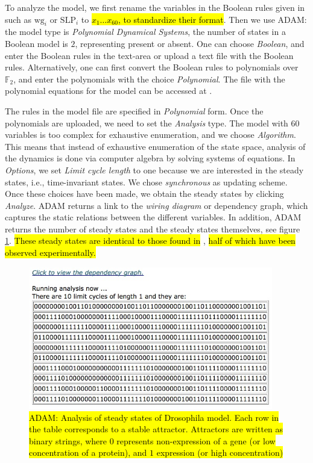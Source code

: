 \documentclass[10pt]{bmc_article}
\newenvironment{bmcformat}{\begin{raggedright}\baselineskip20pt\sloppy\setboolean{publ}{false}}{\end{raggedright}\baselineskip20pt\sloppy}
\begin{document}
\begin{bmcformat}
To analyze the model, we first rename the variables in the Boolean rules given in \cite{AO} such as $\text{wg}_i$ or $\text{SLP}_i$ to \hl{$x_1 \ldots x_{60}$, to standardize their format}. Then we use ADAM: the model type is {\it Polynomial Dynamical Systems}, the number of states in a Boolean model is $2$, representing present or absent. One can choose {\it Boolean}, and enter the Boolean rules in the text-area or upload a text file with the Boolean rules. Alternatively, one can first convert the Boolean rules to polynomials over $\mathbb F_2$, and enter the polynomials with the choice {\it Polynomial}.
The file with the polynomial equations for the model can be accessed at \cite{ADAMRepo}. 

The rules in the model file are specified in {\it Polynomial} form. Once the polynomials are uploaded, we need to set the {\it Analysis} type. The model with $60$ variables is too complex for exhaustive enumeration, and we choose {\it Algorithm}. This means that instead of exhaustive enumeration of the state space, analysis of the dynamics is done via computer algebra by solving systems of equations.
In {\it Options}, we set {\it Limit cycle length} to one because we are interested in the steady states, i.e., time-invariant states.
We chose {\it synchronous} as updating scheme. Once these choices have been made,
we obtain the steady states by clicking {\it Analyze}.
ADAM returns a link to the {\it wiring diagram} or dependency graph, which captures the static relations between the different variables. In addition, ADAM returns the number of steady states and the steady states themselves, see figure \ref{fig:alg}. \hl{These steady states are identical to those found in} \cite{AO}, \hl{half of which have been observed experimentally.} 
\begin{figure}[htb]
	\centering
	\includegraphics[width=0.95\textwidth]{DroAlgOutput.jpg}
	\caption{\hl{ADAM: Analysis of steady states of Drosophila model. Each row in the table corresponds to a stable attractor. Attractors are written as binary strings, where $0$ represents non-expression of a gene (or low concentration of a protein), and $1$ expression (or high concentration)}}
	\label{fig:alg}
\end{figure}


\end{bmcformat}
\end{document}
